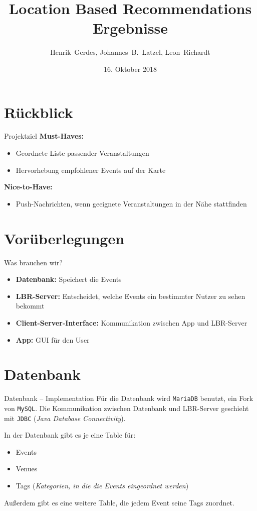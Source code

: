 \documentclass{beamer}
\title{Location Based Recommendations\\Ergebnisse}
\author[H.~Gerdes, J.B.~Latzel, L.~Richardt]{Henrik~Gerdes, Johannes~B.~Latzel, Leon~Richardt}
\institute{Universität Osnabrück}
\date[16.10.2018]{16. Oktober 2018}
\begin{document}
	
	\begin{frame}
		\titlepage
	\end{frame}

	\section{Rückblick}
		\begin{frame}{Projektziel}
		\textbf{Must-Haves:}
		\begin{itemize}
			\item Geordnete Liste passender Veranstaltungen
			\item Hervorhebung empfohlener Events auf der Karte
		\end{itemize}
		
		\textbf{Nice-to-Have:}
		\begin{itemize}
			\item Push-Nachrichten, wenn geeignete Veranstaltungen in der Nähe stattfinden
		\end{itemize}
	\end{frame}

	\section{Vorüberlegungen}
	\begin{frame}{Was brauchen wir?}
			\begin{itemize}
				\item \textbf{Datenbank:} Speichert die Events
				\item \textbf{LBR-Server:} Entscheidet, welche Events ein bestimmter Nutzer zu sehen bekommt
				\item \textbf{Client-Server-Interface:} Kommunikation zwischen App und LBR-Server
				\item \textbf{App:} GUI für den User
			\end{itemize}
	\end{frame}

	\section{Datenbank}
	\begin{frame}{Datenbank -- Implementation}
		Für die Datenbank wird \alert{\texttt{MariaDB}} benutzt, ein Fork von \texttt{MySQL}. Die Kommunikation zwischen Datenbank und LBR-Server geschieht mit \alert{\texttt{JDBC}} (\textit{Java Database Connectivity}).
		
		\pause
		In der Datenbank gibt es je eine Table für:
		\begin{itemize}
			\item Events
			\item Venues
			\item Tags (\textit{Kategorien, in die die Events eingeordnet werden})
		\end{itemize}
		Außerdem gibt es eine weitere Table, die jedem Event seine Tags zuordnet.
		
	\end{frame}
\end{document}
